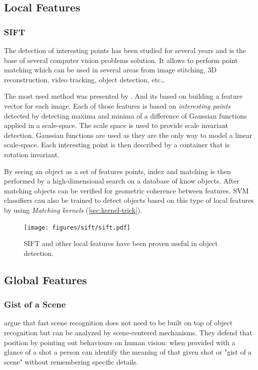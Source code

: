 \subsection{Local Features}
\label{sec:local-features}

\subsubsection{SIFT}
\label{sec:sift}
The detection of interesting points has been studied for several years and is
the base of several computer vision problems solution. It allows to perform
point matching which can be used in several areas from image stitching,
3D reconstruction, video tracking, object detection, etc\dots

The most used method was presented by \cite{lowe1999object}. And its based on
building a feature vector for each image. Each of those features is based on
\emph{interesting points} detected by detecting maxima and minima of a
difference of Gaussian functions applied in a scale-space.
The scale space is used to provide scale invariant detection. Gaussian functions
are used as they are the only way to model a linear scale-space.
Each interesting point is then described by a container that is rotation
invariant.

By seeing an object as a set of features points, index and matching is then
performed by a high-dimensional search on a database of know objects. After
matching objects can be verified for geometric coherence between features.
\Gls{SVM} classifiers can also be trained to detect objects based on this type
of local features by using \emph{Matching kernels} (\autoref{sec:kernel-trick}).

\begin{figure}[h]
    \texttt{[image: figures/sift/sift.pdf]}
    \caption{{SIFT} and other local features have been proven useful in object
             detection.}
\end{figure}


\subsection{Global Features}

\subsubsection{Gist of a Scene}
\label{sec:gist}
\cite{oliva2006building} argue that fast scene recognition does not need to be
built on top of object recognition but can be analyzed by scene-centered
mechanisms.
They defend that position by pointing out behaviours on human vision:
when provided with a glance of a shot a person can identify the meaning of that
given shot or "gist of a scene" without remembering specific details.

